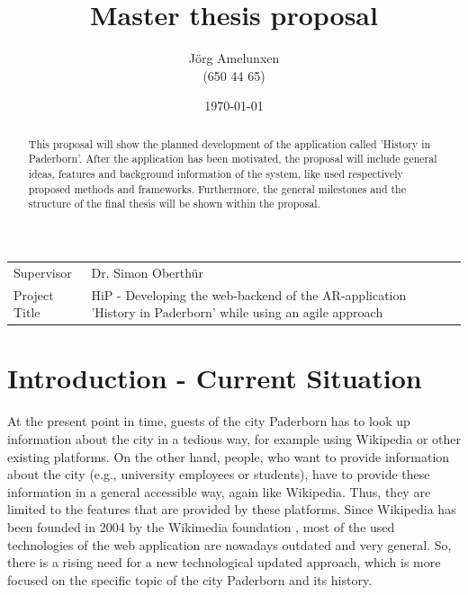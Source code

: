 \documentclass[a4page]{article}
\author{J\"org Amelunxen \\
(650 44 65)
}
\title{Master thesis proposal 
}
\date{\today}
\begin{document}
\maketitle

\newcommand{\stab}[1]{\hspace{.05\textwidth}\rlap{#1}}
\newcommand{\tab}[1]{\hspace{.1\textwidth}\rlap{#1}}

\begin{table}[!th]
\begin{tabular}{l p{}}
Supervisor & Dr. Simon Oberth\"ur \\
Project Title &  HiP - Developing the web-backend of the AR-application 'History in Paderborn' while using an agile approach
\end{tabular}
\end{table}

\begin{abstract}
This proposal will show the planned development of the application called 'History in Paderborn'. After the application has been motivated, the proposal will include general ideas, features and background information of the system, like used respectively proposed methods and frameworks. Furthermore, the general milestones and the structure of the final thesis will be shown within the proposal. 
\end{abstract}

\section{Introduction - Current Situation}
At the present point in time, guests of the city Paderborn has to look up information about the city in a tedious way, for example using Wikipedia or other existing platforms. On the other hand, people, who want to provide information about the city (e.g., university employees or students), have to provide these information in a general accessible way, again like Wikipedia. Thus, they are limited to the features that are provided by these platforms. Since Wikipedia has been founded in 2004 by the Wikimedia foundation \cite{wikimedia}, most of the used technologies of the web application are nowadays outdated and very general. So, there is a rising need for a new technological updated approach, which is more focused on the specific topic of the city Paderborn and its history. 
\end{document}
